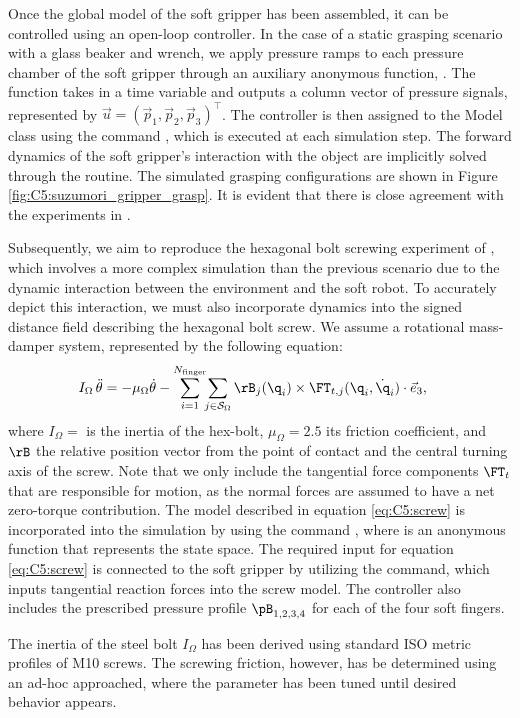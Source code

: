 Once the global model of the soft gripper has been assembled, it can be controlled using an open-loop controller. In the case of a static grasping scenario with a glass beaker and wrench, we apply pressure ramps to each pressure chamber of the soft gripper through an auxiliary anonymous function, . The function takes in a time variable and outputs a column vector of pressure signals, represented by $\vec{u} = (\vec{p}_1, \vec{p}_2, \vec{p}_3)^\top$. The controller is then assigned to the Model class using the command , which is executed at each simulation step. The forward dynamics of the soft gripper's interaction with the object are implicitly solved through the  routine. The simulated grasping configurations are shown in Figure \ref{fig:C5:suzumori_gripper_grasp}. It is evident that there is close agreement with the experiments in \cite{Suzumori1991,Suzumori1992}.

Subsequently, we aim to reproduce the hexagonal bolt screwing experiment of \cite{Suzumori1992,Suzumori1991}, which involves a more complex simulation than the previous scenario due to the dynamic interaction between the environment and the soft robot. To accurately depict this interaction, we must also incorporate dynamics into the signed distance field describing the hexagonal bolt screw. We assume a rotational mass-damper system, represented by the following equation:
%
\begin{align}
    I_\Omega\,\ddot{\theta} & = -\mu_\Omega \dot{\theta} -\sum_{i=1}^{N_{\textrm{finger}}} \!\!\sum_{j \in \mathcal{S}_\Omega} \rB_j (\q_i) \times \FT_{t,j}(\q_i,\dot{\q}_i) \cdot \vec{e}_3,                                                                      
    \label{eq:C5:screw}
\end{align}
%
where $I_\Omega = $ is the inertia of the hex-bolt, $\mu_\Omega = 2.5$ its friction coefficient, and $\rB$ the relative position vector from the point of contact and the central turning axis of the screw. Note that we only include the tangential force components $\FT_t$ that are responsible for motion, as the normal forces are assumed to have a net zero-torque contribution. The model described in equation \eqref{eq:C5:screw} is incorporated into the simulation by using the command , where  is an anonymous function that represents the state space. The required input  for equation \eqref{eq:C5:screw} is connected to the soft gripper by utilizing the  command, which inputs tangential reaction forces into the screw model. The controller also includes the prescribed pressure profile $\pB_{1,2,3,4}$ for each of the four soft fingers.\\
%
\begin{rmk}
The inertia of the steel bolt $I_\Omega$ has been derived using standard ISO metric profiles of M10 screws. The screwing friction, however, has be determined using an ad-hoc approached, where the parameter has been tuned until desired behavior appears.\\
\end{rmk}
%

